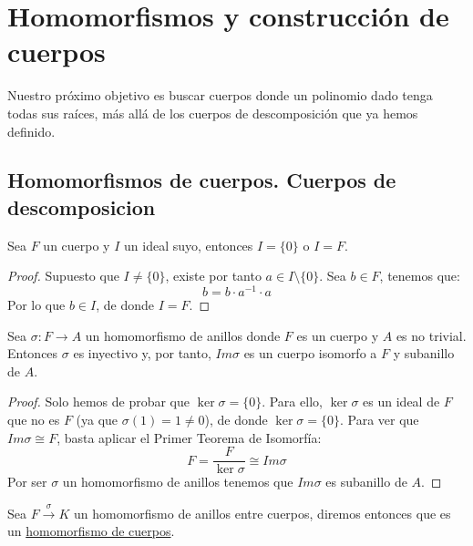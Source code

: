\chapter{Homomorfismos y construcción de cuerpos}

Nuestro próximo objetivo es buscar cuerpos donde un polinomio dado tenga todas sus raíces, más allá de los cuerpos de descomposición que ya hemos definido.

\section{Homomorfismos de cuerpos. Cuerpos de descomposicion}



\begin{lema}
    Sea $F$ un cuerpo y $I$ un ideal suyo, entonces $I = \{0\}$ o $I = F$.
    \begin{proof}
        Supuesto que $I\neq \{0\}$, existe por tanto $a\in I\setminus\{0\}$. Sea $b\in F$, tenemos que:
        \begin{equation*}
            b = b\cdot a^{-1}\cdot a
        \end{equation*}
        Por lo que $b\in I$, de donde $I = F$.
    \end{proof}
\end{lema}

\begin{lema}
    Sea $\sigma:F\to A$ un homomorfismo de anillos donde $F$ es un cuerpo y $A$ es no trivial. Entonces $\sigma$ es inyectivo y, por tanto, $Im \sigma$ es un cuerpo isomorfo a $F$ y subanillo de $A$.
    \begin{proof}
        Solo hemos de probar que $\ker \sigma = \{0\}$. Para ello, $\ker \sigma$ es un ideal de $F$ que no es $F$ (ya que $\sigma(1) = 1\neq 0$), de donde $\ker \sigma = \{0\}$. Para ver que $Im \sigma\cong F$, basta aplicar el Primer Teorema de Isomorfía:
        \begin{equation*}
            F = \dfrac{F}{\ker \sigma} \cong Im \sigma
        \end{equation*}
        Por ser $\sigma$ un homomorfismo de anillos tenemos que $Im\sigma$ es subanillo de $A$.
    \end{proof}
\end{lema}

\begin{definicion}
    Sea $F\stackrel{\sigma}{\to} K$ un homomorfismo de anillos entre cuerpos, diremos entonces que es un \underline{homomorfismo de cuerpos}.
\end{definicion}

